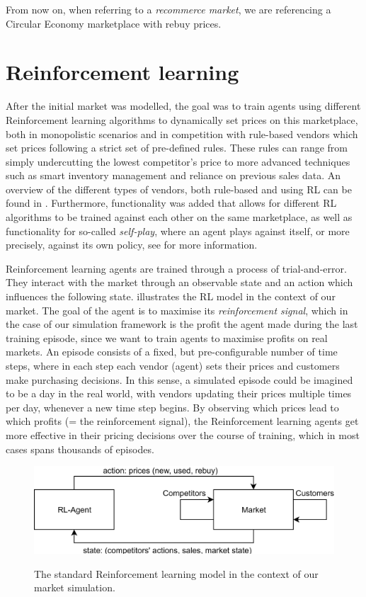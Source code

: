 From now on, when referring to a \emph{recommerce market}, we are referencing a Circular Economy marketplace with rebuy prices.

\clearpage
\section{Reinforcement learning}\label{sec:ReinforcementLearningIntroduction}

After the initial market was modelled, the goal was to train agents using different Reinforcement learning algorithms to dynamically set prices on this marketplace, both in monopolistic scenarios and in competition with rule-based vendors which set prices following a strict set of pre-defined rules. These rules can range from simply undercutting the lowest competitor's price to more advanced techniques such as smart inventory management and reliance on previous sales data. An overview of the different types of vendors, both rule-based and using RL can be found in . Furthermore, functionality was added that allows for different RL algorithms to be trained against each other on the same marketplace, as well as functionality for so-called \emph{self-play}, where an agent plays against itself, or more precisely, against its own policy, see \cite{JanThesis} for more information.

Reinforcement learning agents are trained through a process of trial-and-error. They interact with the market through an observable state and an action which influences the following state.  illustrates the RL model in the context of our market. The goal of the agent is to maximise its \emph{reinforcement signal}, which in the case of our simulation framework is the profit the agent made during the last training episode, since we want to train agents to maximise profits on real markets. An episode consists of a fixed, but pre-configurable number of time steps, where in each step each vendor (agent) sets their prices and customers make purchasing decisions. In this sense, a simulated episode could be imagined to be a day in the real world, with vendors updating their prices multiple times per day, whenever a new time step begins. By observing which prices lead to which profits (= the reinforcement signal), the Reinforcement learning agents get more effective in their pricing decisions over the course of training, which in most cases spans thousands of episodes.

\begin{figure}[t]
	\centering
	\includegraphics[width = \textwidth]{images/RL_overview.png}\\
	\caption{The standard Reinforcement learning model in the context of our market simulation.\\ }\label{fig:IntroRLDiagram}
\end{figure}
